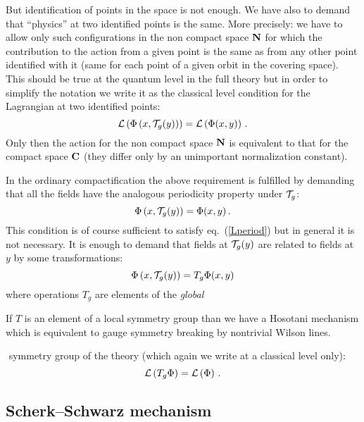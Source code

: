 \documentclass[a4paper,12pt]{article}
\def\cL{{\cal L}}
\def\cT{{\cal T}}
\def\bC{{\bf C}}
\def\bN{{\bf N}}
\begin{document}
But identification of points in the space is not enough. We have also
to demand that ``physics'' at two identified points is the 
same. More precisely: we have to allow only such configurations in the
non compact space $\bN$ for which the contribution to the action from
a given point is the same as from any other point identified with it
(same for each point of a given orbit in the covering space).
This should be true at the quantum level in the full theory but in
order to simplify the notation we write it as the classical level
condition for the Lagrangian at two identified points:
\begin{equation}
\cL\left(\Phi\left(x,\cT_g(y)\right)\right)
=
\cL\left(\Phi(x,y)\right)
\,.
\label{Lperiod}
\end{equation}
Only then the action for the non compact space $\bN$ is equivalent 
to that for the compact space $\bC$ (they differ only by an
unimportant normalization constant).  


In the ordinary compactification the above requirement is fulfilled by 
demanding that all the fields have the analogous periodicity property
under $\cT_g$: 
\begin{equation}
\Phi\left(x,\cT_g(y)\right)=\Phi(x,y)
\,.
\end{equation}
This condition is of course sufficient to satisfy eq.\ (\ref{Lperiod})
but in general it is not necessary. It is enough to demand that
fields at $\cT_g(y)$ are related to fields at $y$ by some
transformations: 
\begin{equation}
\Phi\left(x,\cT_g(y)\right)=T_g\Phi(x,y)
\label{PhiPeriod}
\end{equation}
where operations $T_g$ are elements of the 
{\it global}$\,\,$\begin{footnote}
{If $T$ is an element of a local symmetry group than we have a
Hosotani mechanism 
\cite{Hosotani:1983xw,Hosotani:1988bm} 
which is equivalent to gauge symmetry breaking by
nontrivial Wilson lines.}
\end{footnote}$\!$
symmetry group of the theory (which again we write at a classical level
only):
\begin{equation}
\cL\left(T_g\Phi\right)=\cL\left(\Phi\right)
\,.
\label{PhiSS}
\end{equation}




\subsection{Scherk--Schwarz mechanism}
\end{document}

